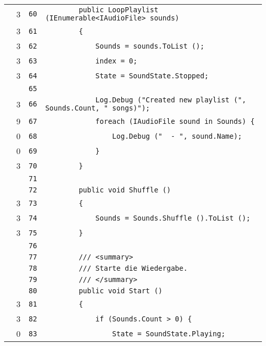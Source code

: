 \documentclass[a4paper,10pt]{article}
\begin{document}
\begin{longtable}[l]{lrrl}
\cellcolor{green} & 3 & \verb~60~ & \verb~        public LoopPlaylist (IEnumerable<IAudioFile> sounds)~\\
\cellcolor{green} & 3 & \verb~61~ & \verb~        {~\\
\cellcolor{green} & 3 & \verb~62~ & \verb~            Sounds = sounds.ToList ();~\\
\cellcolor{green} & 3 & \verb~63~ & \verb~            index = 0;~\\
\cellcolor{green} & 3 & \verb~64~ & \verb~            State = SoundState.Stopped;~\\
\cellcolor{gray} &  & \verb~65~ & \verb~~\\
\cellcolor{green} & 3 & \verb~66~ & \verb~            Log.Debug ("Created new playlist (", Sounds.Count, " songs)");~\\
\cellcolor{green} & 9 & \verb~67~ & \verb~            foreach (IAudioFile sound in Sounds) {~\\
\cellcolor{red} & 0 & \verb~68~ & \verb~                Log.Debug ("  - ", sound.Name);~\\
\cellcolor{red} & 0 & \verb~69~ & \verb~            }~\\
\cellcolor{green} & 3 & \verb~70~ & \verb~        }~\\
\cellcolor{gray} &  & \verb~71~ & \verb~~\\
\cellcolor{gray} &  & \verb~72~ & \verb~        public void Shuffle ()~\\
\cellcolor{green} & 3 & \verb~73~ & \verb~        {~\\
\cellcolor{green} & 3 & \verb~74~ & \verb~            Sounds = Sounds.Shuffle ().ToList ();~\\
\cellcolor{green} & 3 & \verb~75~ & \verb~        }~\\
\cellcolor{gray} &  & \verb~76~ & \verb~~\\
\cellcolor{gray} &  & \verb~77~ & \verb~        /// <summary>~\\
\cellcolor{gray} &  & \verb~78~ & \verb~        /// Starte die Wiedergabe.~\\
\cellcolor{gray} &  & \verb~79~ & \verb~        /// </summary>~\\
\cellcolor{gray} &  & \verb~80~ & \verb~        public void Start ()~\\
\cellcolor{green} & 3 & \verb~81~ & \verb~        {~\\
\cellcolor{green} & 3 & \verb~82~ & \verb~            if (Sounds.Count > 0) {~\\
\cellcolor{red} & 0 & \verb~83~ & \verb~                State = SoundState.Playing;~\\

\end{longtable}
\end{document}

